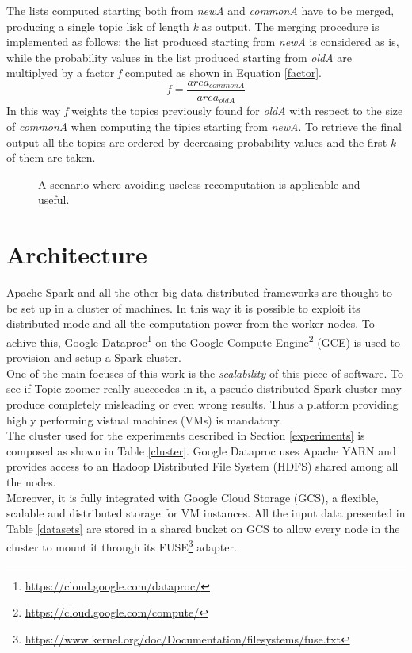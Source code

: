\documentclass{sig-alternate-05-2015}
\begin{document}
The lists computed starting both from \emph{newA} and \emph{commonA} have to be merged, producing a single topic lisk of length \emph{k} as output. The merging procedure is implemented as follows; the list produced starting from \emph{newA} is considered as is, while the probability values in the list produced starting from \emph{oldA} are multiplyed by a factor \emph{f} computed as shown in Equation \ref{factor}.
\begin{equation}\label{factor}
    f = \frac{area_{commonA}}{area_{oldA}}
\end{equation}
In this way \emph{f} weights the topics previously found for \emph{oldA} with respect to the size of \emph{commonA} when computing the tipics starting from \emph{newA}. To retrieve the final output all the topics are ordered by decreasing probability values and  the first \emph{k} of them are taken.

\begin{figure}[t]
  \caption{A scenario where avoiding useless recomputation is applicable and useful.}
  \label{recomputationSchema}
\end{figure}

\section{Architecture}
Apache Spark and all the other big data distributed frameworks are thought to be set up in a cluster of machines. In this way it is possible to exploit its distributed mode and all the computation power from the worker nodes. To achive this, Google Dataproc\footnote{\url{https://cloud.google.com/dataproc/}} on the Google Compute Engine\footnote{\url{https://cloud.google.com/compute/}} (GCE) is used to provision and setup a Spark cluster.\\

One of the main focuses of this work is the \emph{scalability} of this piece of software. To see if Topic-zoomer really succeedes in it, a pseudo-distributed Spark cluster may produce completely misleading or even wrong results. Thus a platform providing highly performing vistual machines (VMs) is mandatory.\\
The cluster used for the experiments described in Section \ref{experiments} is composed as shown in Table \ref{cluster}. Google Dataproc uses Apache YARN and provides access to an Hadoop Distributed File System (HDFS) shared among all the nodes.\\
Moreover, it is fully integrated with Google Cloud Storage (GCS), a flexible, scalable and distributed storage for VM instances. All the input data presented in Table \ref{datasets} are stored in a shared bucket on GCS to allow every node in the cluster to mount it through its FUSE\footnote{\url{https://www.kernel.org/doc/Documentation/filesystems/fuse.txt}} adapter.  
\end{document}
